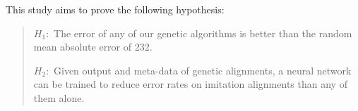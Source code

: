 This study aims to prove the following hypothesis:
	\begin{quote}
		$H_{1}:$ The error of any of our genetic algorithms is better than the random mean absolute error of 232.%

		$H_{2}:$ Given output and meta-data of genetic alignments, a neural network can be trained to reduce error rates on imitation alignments than any of them alone.
		
	\end{quote}

